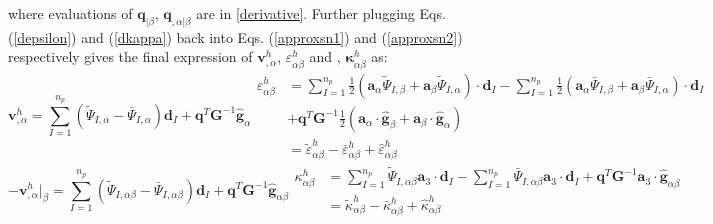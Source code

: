 where evaluations of $\boldsymbol q_{\vert \beta}$, $\boldsymbol q_{,\alpha\vert\beta}$ are \DIFdelbegin {}\DIFdelend \DIFaddbegin {}\DIFaddend in \ref{derivative}. Further plugging Eqs. (\ref{depsilon}) and (\ref{dkappa}) back into Eqs. (\ref{approxsn1}) and (\ref{approxsn2}) respectively gives the final expression of $\boldsymbol v^h_{,\alpha}$, $\varepsilon^h_{\alpha\beta}$ and \DIFdelbegin {}\DIFdelend \DIFaddbegin {}\DIFaddend , $\boldsymbol \kappa^h_{\alpha\beta}$ as: \begin{subequations}
\begin{equation}
\boldsymbol v^h_{,\alpha} = \sum_{I=1}^{n_p}(
\tilde \Psi_{I,\alpha} - \bar \Psi_{I,\alpha}) \boldsymbol d_I +
\boldsymbol q^T \boldsymbol G^{-1}\hat{\boldsymbol g}_{\alpha}
\end{equation}
\begin{equation}\label{epsilonh}
\begin{split}
\varepsilon^h_{\alpha\beta} &= 
\sum_{I=1}^{n_p} \frac{1}{2}(\boldsymbol a_\alpha \tilde \Psi_{I,\beta} + \boldsymbol a_\beta \tilde \Psi_{I,\alpha}) \cdot \boldsymbol d_I 
- \sum_{I=1}^{n_p} \frac{1}{2}(\boldsymbol a_\alpha \bar \Psi_{I,\beta} + \boldsymbol a_\beta \bar \Psi_{I,\alpha}) \cdot \boldsymbol d_I \\
&+ \boldsymbol q^T \boldsymbol G^{-1} \frac{1}{2}(\boldsymbol a_\alpha \cdot \hat{\boldsymbol g}_{\beta} + \boldsymbol a_\beta \cdot \hat{\boldsymbol g}_{\alpha}) \\
&= \tilde \varepsilon^h_{\alpha\beta} - \bar \varepsilon^h_{\alpha\beta} + \hat \varepsilon^h_{\alpha\beta}
\end{split}
\end{equation}
\end{subequations}
\begin{subequations}
\begin{equation}
-\boldsymbol v^h_{,\alpha}\vert_\beta = \sum_{I=1}^{n_p} (
\tilde \Psi_{I,\alpha\beta} -
\bar \Psi_{I,\alpha\beta} ) \boldsymbol d_I +
\boldsymbol q^T \boldsymbol G^{-1}\hat{\boldsymbol g}_{\alpha\beta}
\end{equation}
\begin{equation}\label{kappah}
\begin{split}
\kappa^h_{\alpha\beta} &= \sum_{I=1}^{n_p} \tilde \Psi_{I,\alpha\beta} \boldsymbol a_3 \cdot \boldsymbol d_I
- \sum_{I=1}^{n_p} \bar \Psi_{I,\alpha\beta} \boldsymbol a_3 \cdot \boldsymbol d_I +
\boldsymbol q^T \boldsymbol G^{-1}\boldsymbol a_3 \cdot \hat{\boldsymbol g}_{\alpha\beta} \\
&= \tilde \kappa^h_{\alpha\beta} - \bar \kappa^h_{\alpha\beta} + \hat \kappa^h_{\alpha\beta}
\end{split}
\end{equation}
\end{subequations}
